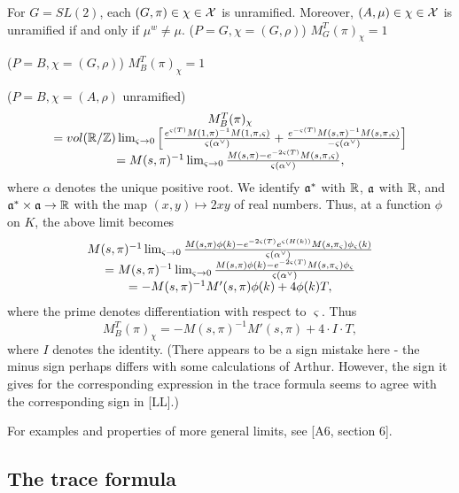 \begin{example} For $G=SL(2)$, each $(G,\pi)\in\chi\in{\cal{X}}$ is
unramified. Moreover, $(A,\mu)\in\chi\in{\cal{X}}$ is unramified
if and only if $\mu^w\not=\mu$.
($P=G,\chi =(G,\rho )$) $M_G^T(\pi )_\chi =1$

($P=B,\chi =(G,\rho )$) $M_B^T(\pi )_\chi =1$

($P=B,\chi =(A,\rho )$ unramified) 
\[
\begin{array}{c}
M_B^T(\pi )_\chi \\
=vol({\Bbb{R}}/{\Bbb{Z}})
\lim_{\varsigma \rightarrow 0}
\left[
\frac{e^{\varsigma (T)}
M(1,\pi )^{-1}M(1,\pi ,\varsigma )}{\varsigma (\alpha^{\vee })}
+\frac{e^{-\varsigma (T)}
M(s,\pi )^{-1}M(s,\pi ,\varsigma )}{-\varsigma (\alpha^{\vee })}
\right]\\
=M(s,\pi)^{-1}
\lim_{\varsigma \rightarrow 0}
{M(s,\pi)-e^{-2\varsigma (T)}M(s,\pi,\varsigma)
\over \varsigma(\alpha^\vee)} ,
\end{array}
\]
where $\alpha $ denotes the unique positive root.
We identify ${\frak{a}}^*$ with ${\Bbb{R}}$, ${\frak{a}}$ with
${\Bbb{R}}$, and
${\frak{a}}^*\times {\frak{a}}\rightarrow {\Bbb{R}}$ with
the map $(x,y)\longmapsto 2xy$
of real numbers. Thus, at a function $\phi$
on $K$, the above limit becomes 
\[
\begin{array}{c}
M(s,\pi)^{-1}
\lim_{\varsigma \rightarrow 0}
{M(s,\pi)\phi(k)-e^{-2\varsigma (T)}e^{\varsigma (H(k))}
M(s,\pi_\varsigma)\phi_\varsigma(k)
\over \varsigma(\alpha^\vee)} \\
=M(s,\pi)^{-1}
\lim_{\varsigma \rightarrow 0}
{M(s,\pi)\phi(k)-e^{-2\varsigma (T)}M(s,\pi_\varsigma)\phi_\varsigma
\over \varsigma(\alpha^\vee)} \\
=-M(s,\pi)^{-1}M'(s,\pi)\phi(k)+4 \phi(k) T,
\end{array}
\]
where the prime denotes differentiation with respect to
$\varsigma$. Thus
\[
M_B^T(\pi )_\chi =
-M(s,\pi)^{-1}M'(s,\pi)+4\cdot I\cdot T,
\]
where $I$ denotes the identity. (There appears to be a sign
mistake here - the minus sign perhaps differs with some
calculations of Arthur. However, the sign it gives for the
corresponding expression in the trace formula
seems to agree with the corresponding sign in [LL].)

For
examples and properties of more general limits, see [A6, section 6].
\end{example}


\subsection{The trace formula}

